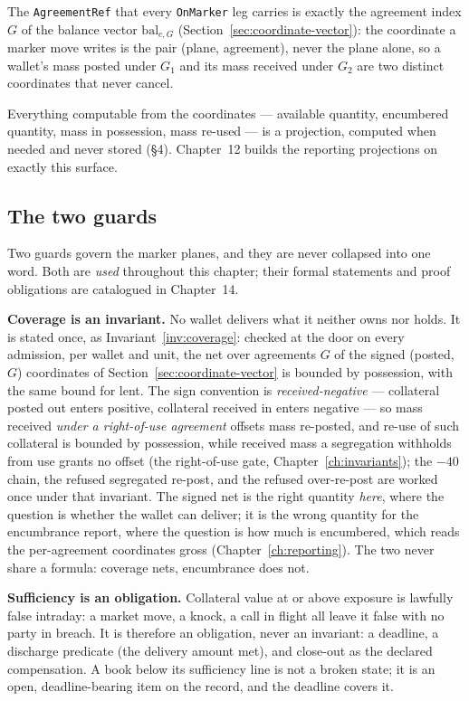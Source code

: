 \documentclass[11pt,a4paper]{article}
\begin{document}
The \texttt{AgreementRef} that every \texttt{OnMarker} leg carries is exactly the
agreement index $G$ of the balance vector $\mathrm{bal}_{c,G}$
(Section~\ref{sec:coordinate-vector}): the coordinate a marker move writes is the
pair (plane, agreement), never the plane alone, so a wallet's mass posted under $G_1$ and
its mass received under $G_2$ are two distinct coordinates that never cancel.

Everything computable from the coordinates --- available quantity, encumbered
quantity, mass in possession, mass re-used --- is a projection, computed when
needed and never stored (\S4). Chapter~12 builds the reporting projections on
exactly this surface.

\subsection{The two guards}

Two guards govern the marker planes, and they are never collapsed into one
word. Both are \emph{used} throughout this chapter; their formal statements and
proof obligations are catalogued in Chapter~14.

\textbf{Coverage is an invariant.} No wallet delivers what it neither owns nor
holds. It is stated once, as Invariant~\ref{inv:coverage}: checked at the door on
every admission, per wallet and unit, the net over agreements $G$ of the signed
(posted, $G$) coordinates of Section~\ref{sec:coordinate-vector} is bounded by
possession, with the same bound for lent. The sign convention is
\emph{received-negative} --- collateral posted out enters positive, collateral
received in enters negative --- so mass received \emph{under a right-of-use agreement}
offsets mass re-posted, and re-use of such collateral is bounded by possession, while
received mass a segregation withholds from use grants no offset (the right-of-use gate,
Chapter~\ref{ch:invariants}); the $-40$ chain, the refused segregated re-post, and the
refused over-re-post are worked once under that invariant. The signed net is the right
quantity \emph{here}, where the question is whether the wallet can deliver; it is
the wrong quantity for the encumbrance report, where the question is how much is
encumbered, which reads the per-agreement coordinates gross
(Chapter~\ref{ch:reporting}). The two never share a formula: coverage nets,
encumbrance does not.

\textbf{Sufficiency is an obligation.} Collateral value at or above exposure
is lawfully false intraday: a market move, a knock, a call in flight all leave
it false with no party in breach. It is therefore an obligation, never an
invariant: a deadline, a discharge predicate (the delivery amount met), and
close-out as the declared compensation. A book below its sufficiency line is
not a broken state; it is an open, deadline-bearing item on the record, and
the deadline covers it.
\end{document}
